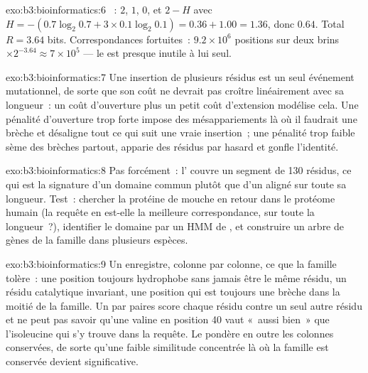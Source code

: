 \begin{solution}{exo:b3:bioinformatics:6}
~: $2$, $1$, $0$, et $2 - H$ avec $H = -(0.7\log_{2}
0.7 + 3\times 0.1\log_{2} 0.1) = 0.36 + 1.00 = 1.36$, donc $0.64$.
Total $R = 3.64$ bits. Correspondances fortuites~: $9.2\times 10^{6}$
positions sur deux brins $\times 2^{-3.64} \approx 7\times 10^{5}$ ---
le  est presque inutile à lui seul.
\end{solution}

\begin{solution}{exo:b3:bioinformatics:7}
Une insertion de plusieurs résidus est un seul événement mutationnel,
de sorte que son coût ne devrait pas croître linéairement avec sa
longueur~: un coût d'ouverture plus un petit coût d'extension modélise
cela. Une pénalité d'ouverture trop forte impose des mésappariements là
où il faudrait une brèche et désaligne tout ce qui suit une vraie
insertion~; une pénalité trop faible sème des brèches partout, apparie
des résidus par hasard et gonfle l'identité.
\end{solution}

\begin{solution}{exo:b3:bioinformatics:8}
Pas forcément~: l' couvre un segment de \num{130} résidus, ce
qui est la signature d'un domaine commun plutôt que d'un 
aligné sur toute sa longueur. Test~: chercher la protéine de mouche en
retour dans le protéome humain (la requête en est-elle la meilleure
correspondance, sur toute la longueur~?), identifier le domaine par un
HMM de , et construire un arbre de gènes de la famille dans
plusieurs espèces.
\end{solution}

\begin{solution}{exo:b3:bioinformatics:9}
Un  enregistre, colonne par colonne, ce que la famille tolère~:
une position toujours hydrophobe sans jamais être le même résidu, un
résidu catalytique invariant, une position qui est toujours une brèche
dans la moitié de la famille. Un  par paires score chaque
résidu contre un seul autre résidu et ne peut pas savoir qu'une valine
en position 40 vaut «~aussi bien~» que l'isoleucine qui s'y trouve dans
la requête. Le  pondère en outre les colonnes conservées, de sorte
qu'une faible similitude concentrée là où la famille est conservée
devient significative.
\end{solution}

